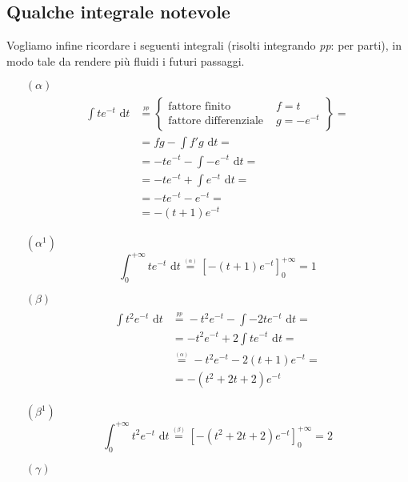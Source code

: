 \subsection{Qualche integrale notevole}
 Vogliamo infine ricordare i seguenti integrali (risolti integrando \textit{pp}: per parti), in modo tale da rendere più fluidi i futuri passaggi.
\begin{enumerate}
\item [$(\alpha)$]
\begin{gather*}
\begin{aligned}
\int te^{-t}\text{ d}t&\overset{\underset{\textit{pp}}{}}{=}\begin{Bmatrix}
\text{fattore finito }&f=t \\ \text{fattore differenziale }&g=-e^{-t}
\end{Bmatrix}=  \\
&=fg-\int f'g\text{ d}t=\\
&=-te^{-t}-\int-e^{-t}\text{ d}t=\\
&=-te^{-t}+\int e^{-t}\text{ d}t=\\
&=-te^{-t}-e^{-t}=\\
&=-(t+1)e^{-t}
\end{aligned}
\end{gather*}
\item [$(\alpha^1)$]
\begin{equation*}
\int_0^{+\infty} te^{-t}\text{ d}t\overset{\underset{(\alpha)}{}}{=}\left[-(t+1)e^{-t}\right]_0^{+\infty}=1
\end{equation*}
\item [$(\beta)$]
\begin{gather*}
\begin{aligned}
\int t^2e^{-t}\text{ d}t&\overset{\underset{\textit{pp}}{}}{=}-t^2e^{-t}-\int-2te^{-t}\text{ d}t=\\
&=-t^2e^{-t}+2\int te^{-t}\text{ d}t=\\
&\overset{\underset{(\alpha)}{}}{=}-t^2e^{-t}-2(t+1)e^{-t}=\\
&=-(t^2+2t+2)e^{-t}
\end{aligned}
\end{gather*}
\item [$(\beta^1)$]
\begin{equation*}
\int_0^{+\infty} t^2e^{-t}\text{ d}t\overset{\underset{(\beta)}{}}{=}\left[-(t^2+2t+2)e^{-t}\right]_0^{+\infty}=2
\end{equation*}
\item [$(\gamma)$]
\begin{gather*}

\end{gather*}
\end{enumerate}

